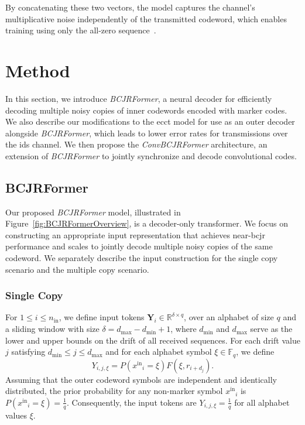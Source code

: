 \documentclass[conference,letterpaperu]{IEEEtran}
\newcommand{\yinIx}{\ensuremath{x^{\text{in}}}}
\newcommand{\Yval}{\ensuremath{\xi}}
\newcommand{\nin}{\ensuremath{n_{\text{in}}}}
\newcommand{\recIx}{\ensuremath{r}}
\newcommand{\bcjrformerInput}{\ensuremath{\bm{Y}}}
\newcommand{\bcjrformerInputIx}{\ensuremath{Y}}
\newcommand{\alphabet}{\ensuremath{\mathbb{F}_q}}
\begin{document}
By concatenating these two vectors, the model captures the channel's multiplicative noise independently of the transmitted codeword, which enables training using only the all-zero sequence~\cite{bennatanDeepLearningDecoding2018b}.

\section{Method}

In this section, we introduce \textit{BCJRFormer}, a neural decoder for efficiently decoding multiple noisy copies of inner codewords encoded with marker codes. We also describe our modifications to the \ac{ecct} model for use as an outer decoder alongside \textit{BCJRFormer}, which leads to lower error rates for transmissions over the \ac{ids} channel. We then propose the \textit{ConvBCJRFormer} architecture, an extension of \textit{BCJRFormer} to jointly synchronize and decode convolutional codes. 


\subsection{BCJRFormer}
\label{sec:BCJRFormer}
Our proposed \textit{BCJRFormer} model, illustrated in Figure~\ref{fig:BCJRFormerOverview}, is a decoder-only transformer. We focus on constructing an appropriate input representation that achieves near-\ac{bcjr} performance and scales to jointly decode multiple noisy copies of the same codeword. We separately describe the input construction for the single copy scenario and the multiple copy scenario.

\subsubsection{Single Copy}
\label{sec:methBCJRFormerSingleTransmission}

For $1 \leq i \leq \nin$, we define input tokens $\bcjrformerInput_i \in \mathbb{R}^{\delta \times q}$, over an alphabet of size $q$ and a sliding window with size $\delta = d_{\max} - d_{\min} + 1$, where $d_{\min}$ and $d_{\max}$ serve as the lower and upper bounds on the drift of all received sequences. For each drift value $j$ satisfying $d_{\min} \leq j \leq d_{\max}$ and for each alphabet symbol $\Yval \in \alphabet$, we define 
\begin{equation}
     \label{eq:BCJRFormerInput}
    \bcjrformerInputIx_{i,j,\Yval} = P(\yinIx_i = \Yval)F(\Yval, \recIx_{i + d_j}).
 \end{equation} 
Assuming that the outer codeword symbols are independent and identically distributed, the prior probability for any non-marker symbol \( \yinIx_i \) is \( P(\yinIx_i = \Yval) = \frac{1}{q} \). Consequently, the input tokens are $\bcjrformerInputIx_{i, j, \Yval} = \frac{1}{q}$ for all alphabet values $\Yval$. 
\end{document}
